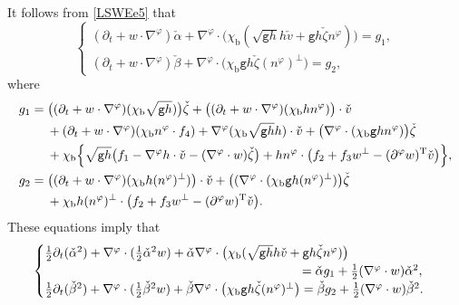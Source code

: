 \documentclass[10pt]{amsart}
\newcommand{\gr}{{\mathtt g}}
\newcommand{\dt}{\partial_t}
\theoremstyle{definition}
\begin{document}
It follows from \eqref{LSWEe5} that
\[
\begin{cases}
(\dt + w\cdot\nabla^\varphi)\check{\alpha} + \nabla^\varphi\cdot\bigl(\chi_\mathrm{b}(\sqrt{\gr h}h\check{v} + \gr h \check{\zeta}n^\varphi)\bigr) = g_1, \\
(\dt+w\cdot\nabla^\varphi)\check{\beta}
+ \nabla^\varphi\cdot\bigl(\chi_\mathrm{b}\gr h\check{\zeta}(n^\varphi)^\perp\bigr) = g_2,
\end{cases}
\]
where
\begin{align*}
g_1
&= \bigl((\dt+w\cdot\nabla^\varphi)(\chi_\mathrm{b}\sqrt{\gr h})\bigr)\check{\zeta} + \bigl((\dt+w\cdot\nabla^\varphi)(\chi_\mathrm{b}h n^\varphi)\bigr)\cdot\check{v} \\
&\quad\;
+ (\dt+w\cdot\nabla^\varphi)(\chi_\mathrm{b}n^\varphi\cdot f_4)
+ \nabla^\varphi(\chi_\mathrm{b}\sqrt{\gr h}h)\cdot\check{v} + \bigl(\nabla^\varphi\cdot(\chi_\mathrm{b}\gr h n^\varphi)\bigr)\check{\zeta} \\
&\quad\;
+ \chi_\mathrm{b}\Bigl\{ \sqrt{\gr h}\bigl(f_1-\nabla^\varphi h\cdot\check{v}-(\nabla^\varphi\cdot w)\check{\zeta}\bigr)
+ h n^\varphi\cdot\bigl(f_2 + f_3w^\perp-(\partial^\varphi w)^\mathrm{T}\check{v}\bigr)\Bigr\}, \\
g_2
&= \bigl((\dt+w\cdot\nabla^\varphi)(\chi_\mathrm{b}h(n^\varphi)^\perp)\bigr)\cdot\check{v} + \bigl((\nabla^\varphi\cdot(\chi_\mathrm{b}\gr h(n^\varphi)^\perp)\bigr)\check{\zeta} \\
&\quad\;
+ \chi_\mathrm{b}h(n^\varphi)^\perp\cdot\bigl(f_2 + f_3w^\perp-(\partial^\varphi w)^\mathrm{T}\check{v}\bigr).
\end{align*}
These equations imply that
\begin{equation}\label{EqCF1}
\begin{cases}
\frac12\dt(\check{\alpha}^2) + \nabla^\varphi\cdot(\frac12\check{\alpha}^2w)
+ \check{\alpha}\nabla^\varphi\cdot\bigl(\chi_\mathrm{b}(\sqrt{\gr h}h\check{v} + \gr h\check{\zeta}n^\varphi)\bigr)\\
\hphantom{\frac12\dt(\check{\beta}^2) + \nabla^\varphi\cdot(\frac12\check{\beta}^2w)
+ \check{\beta}\nabla^\varphi\cdot(\chi_\mathrm{b}\gr h\check{\zeta}(n^\varphi)^\perp)}= \check{\alpha}g_1 + \frac12(\nabla^\varphi\cdot w)\check{\alpha}^2, \\
\frac12\dt(\check{\beta}^2) + \nabla^\varphi\cdot(\frac12\check{\beta}^2w)
+ \check{\beta}\nabla^\varphi\cdot\bigl(\chi_\mathrm{b}\gr h\check{\zeta}(n^\varphi)^\perp\bigr)
= \check{\beta}g_2 + \frac12(\nabla^\varphi\cdot w)\check{\beta}^2.
\end{cases}
\end{equation}
\end{document}
